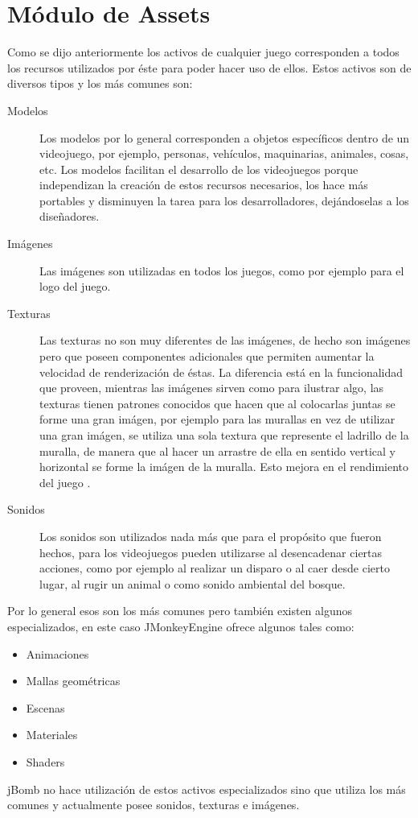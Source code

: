 \documentclass[a4paper,12pt,openany,oneside]{book}
\begin{document}
\section{Módulo de Assets}
Como se dijo anteriormente los activos de cualquier juego corresponden a todos los recursos utilizados por éste para poder hacer uso de ellos. Estos activos son de diversos tipos y los más comunes son:
\begin{description}
\item[Modelos] Los modelos por lo general corresponden a objetos específicos dentro de un videojuego, por ejemplo, personas, vehículos, maquinarias, animales, cosas, etc. Los modelos facilitan el desarrollo de los videojuegos porque independizan la creación de estos recursos necesarios, los hace más portables y disminuyen la tarea para los desarrolladores, dejándoselas a los diseñadores.
\item[Imágenes] Las imágenes son utilizadas en todos los juegos, como por ejemplo para el logo del juego.
\item[Texturas] Las texturas no son muy diferentes de las imágenes, de hecho son imágenes pero que poseen componentes adicionales que permiten aumentar la velocidad de renderización de éstas. La diferencia está en la funcionalidad que proveen, mientras las imágenes sirven como para ilustrar algo, las texturas tienen patrones conocidos que hacen que al colocarlas juntas se forme una gran imágen, por ejemplo para las murallas en vez de utilizar una gran imágen, se utiliza una sola textura que represente el ladrillo de la muralla, de manera que al hacer un arrastre de ella en sentido vertical y horizontal se forme la imágen de la muralla. Esto mejora en el rendimiento del juego  \cite{JMONKEY}.
\item[Sonidos] Los sonidos son utilizados nada más que para el propósito que fueron hechos, para los videojuegos pueden utilizarse al desencadenar ciertas acciones, como por ejemplo al realizar un disparo o al caer desde cierto lugar, al rugir un animal o como sonido ambiental del bosque.
\end{description}
Por lo general esos son los más comunes pero también existen algunos especializados, en este caso JMonkeyEngine ofrece algunos tales como:
\begin{itemize}
\item Animaciones
\item Mallas geométricas
\item Escenas
\item Materiales
\item Shaders
\end{itemize}
jBomb no hace utilización de estos activos especializados sino que utiliza los más comunes y actualmente posee sonidos, texturas e imágenes.
\end{document}
